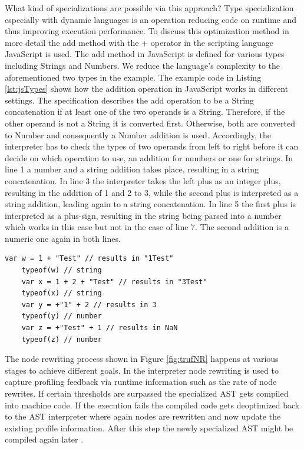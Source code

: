 What kind of specializations are possible via this approach? Type specialization especially with dynamic languages is an operation reducing code on runtime and thus improving execution performance. To discuss this optimization method in more detail the add method with the + operator in the scripting language JavaScript is used. The add method in JavaScript is defined for various types including Strings and Numbers. We reduce the language's complexity to the aforementioned two types in the example. The example code in Listing \ref{lst:jsTypes} shows how the addition operation in JavaScript works in different settings. The specification describes the add operation to be a String concatenation if at least one of the two operands is a String. Therefore, if the other operand is not a String it is converted first. Otherwise, both are converted to Number and consequently a Number addition is used. Accordingly, the interpreter has to check the types of two operands from left to right before it can decide on which operation to use, an addition for numbers or one for strings. In line 1 a number and a string addition takes place, resulting in a string concatenation. In line 3 the interpreter takes the left plus as an integer plus, resulting in the addition of 1 and 2 to 3, while the second plus is interpreted as a string addition, leading again to a string concatenation. In line 5 the first plus is interpreted as a plus-sign, resulting in the string being parsed into a number which works in this case but not in the case of line 7. The second addition is a numeric one again in both lines.

\begin{lstlisting}[caption={JavaScript addition types minimal example}, label={lst:jsTypes}]
	var w = 1 + "Test" // results in "1Test"
	typeof(w) // string
	var x = 1 + 2 + "Test" // results in "3Test"
	typeof(x) // string
	var y = +"1" + 2 // results in 3
	typeof(y) // number
	var z = +"Test" + 1 // results in NaN
	typeof(z) // number
\end{lstlisting}

The node rewriting process shown in Figure \ref{fig:trufNR} happens at various stages to achieve different goals. In the interpreter node rewriting is used to capture profiling feedback via runtime information such as the rate of node rewrites. If certain thresholds are surpassed the specialized AST gets compiled into machine code. If the execution fails the compiled code gets deoptimized back to the AST interpreter where again nodes are rewritten and now update the existing profile information. After this step the newly specialized AST might be compiled again later \cite{wuerthSelf}.

